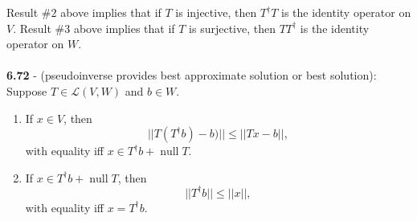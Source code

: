 \documentclass{article}
\DeclareMathOperator{\Null}{null}
\theoremstyle{definition}
\begin{document}
Result $\# 2$ above implies that if $T$ is injective, then $T^\dagger T$ is the identity operator on $V$. Result $\#$3 above implies that if $T$ is surjective, then $TT^\dagger$ is the identity operator on $W$. \\ \\
\textbf{6.72} - (pseudoinverse provides best approximate solution or best solution): Suppose $T \in \mathcal{L}(V, W)$ and $b \in W$. \begin{enumerate}
    \item If $x \in V$, then $$||T(T^\dagger b) - b)|| \leq ||Tx - b||,$$ with equality iff $x \in T^\dagger b + \Null{T}$.
    \item If $x \in T^\dagger b + \Null{T}$, then $$||T^\dagger b|| \leq ||x||,$$ with equality iff $x = T^\dagger b$.
\end{enumerate}
\end{document}
